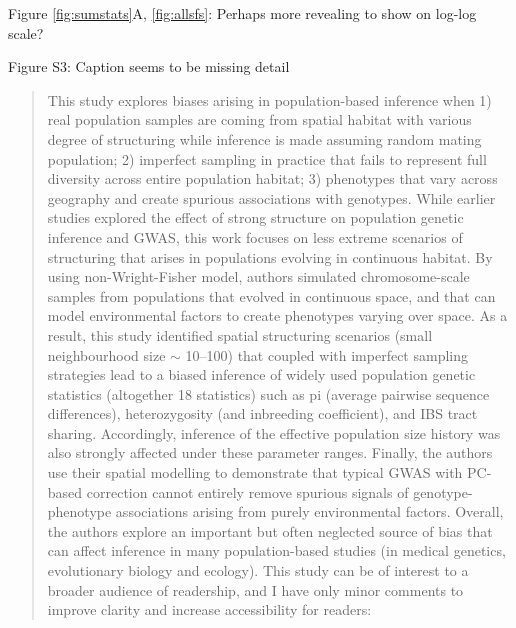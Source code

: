 
\begin{point}{Figure \ref{fig:sumstats}A, \ref{fig:allsfs}:}
    Perhaps more revealing to show on log-log scale?
\end{point}


\begin{point}{Figure S3:}
    Caption seems to be missing detail 
\end{point}





\begin{quote}
    This study explores biases arising in population-based inference when 1)
    real population samples are coming from spatial habitat with various degree
    of structuring while inference is made assuming random mating population;
    2) imperfect sampling in practice that fails to represent full diversity
    across entire population habitat; 3) phenotypes that vary across geography
    and create spurious associations with genotypes. While earlier studies
    explored the effect of strong structure on population genetic inference and
    GWAS, this work focuses on less extreme scenarios of structuring that
    arises in populations evolving in continuous habitat. By using
    non-Wright-Fisher model, authors simulated chromosome-scale samples from
    populations that evolved in continuous space, and that can model
    environmental factors to create phenotypes varying over space. As a result,
    this study identified spatial structuring scenarios (small neighbourhood
    size $\sim$ 10--100) that coupled with imperfect sampling strategies lead to a
    biased inference of widely used population genetic statistics (altogether
    18 statistics) such as pi (average pairwise sequence differences),
    heterozygosity (and inbreeding coefficient), and IBS tract sharing.
    Accordingly, inference of the effective population size history was also
    strongly affected under these parameter ranges. Finally, the authors use
    their spatial modelling to demonstrate that typical GWAS with PC-based
    correction cannot entirely remove spurious signals of genotype-phenotype
    associations arising from purely environmental factors.  Overall, the
    authors explore an important but often neglected source of bias that can
    affect inference in many population-based studies (in medical genetics,
    evolutionary biology and ecology). This study can be of interest to a
    broader audience of readership, and I have only minor comments to improve
    clarity and increase accessibility for readers:
\end{quote}


